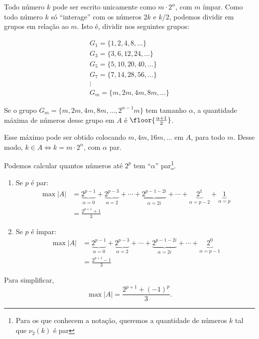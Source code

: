 Todo número $k$ pode ser escrito unicamente como $m\cdot2^\alpha$, com $m$ ímpar. Como todo número $k$ só ``interage'' com os números $2k$ e $k/2$, podemos dividir em grupos em relação ao $m$. Isto é, dividir nos seguintes grupos:

\begin{gather*}
	G_1 = \{1, 2,  4,  8, \dots\}\\
	G_3 = \{3, 6,  12, 24, \dots\}\\
	G_5 = \{5, 10, 20, 40, \dots\}\\
	G_7 =\{7, 14, 28, 56, \dots\}\\
	\vdots\\
	G_m =\{m, 2m, 4m, 8m, \dots\}
\end{gather*}

Se o grupo $G_m = \{m, 2m, 4m, 8m, \dots, 2^{\alpha-1}m\}$ tem tamanho $\alpha$, a quantidade máxima de números desse grupo em $A$ é $\floor{\frac{\alpha+1}{2}}$.

Esse máximo pode ser obtido colocando $m, 4m, 16m, \dots$ em $A$, para todo $m$. Desse modo, $k \in A \iff k = m\cdot2^\alpha$, com $\alpha$ par.

Podemos calcular quantos números até $2^p$ tem ``$\alpha$'' par\footnote{Para os que conhecem a notação, queremos a quantidade de números $k$ tal que $\nu_2(k)$ é par}.

\begin{enumerate}[label = (\alph*)]
	\item Se $p$ é par:
		\begin{align*}
			\max|A| &= \underbrace{2^{p-1}}_{\alpha = 0} + \underbrace{2^{p-3}}_{\alpha = 2} + \cdots + \underbrace{2^{p-1-2i}}_{\alpha = 2i} + \cdots + \underbrace{2^1}_{\alpha = p - 2} + \underbrace{1}_{\alpha=p}\\
					&= \frac{2^{p+1}+1}{3}
		\end{align*}
	\item Se $p$ é ímpar:
		\begin{align*}
			\max|A| &= \underbrace{2^{p-1}}_{\alpha = 0} + \underbrace{2^{p-3}}_{\alpha = 2} + \cdots + \underbrace{2^{p-1-2i}}_{\alpha = 2i} + \cdots + \underbrace{2^0}_{\alpha = p - 1}\\
					&= \frac{2^{p+1}-1}{3}
		\end{align*}	
\end{enumerate}

Para simplificar, \[\max |A| = \frac{2^{p+1} + (-1)^p}{3}.\]
